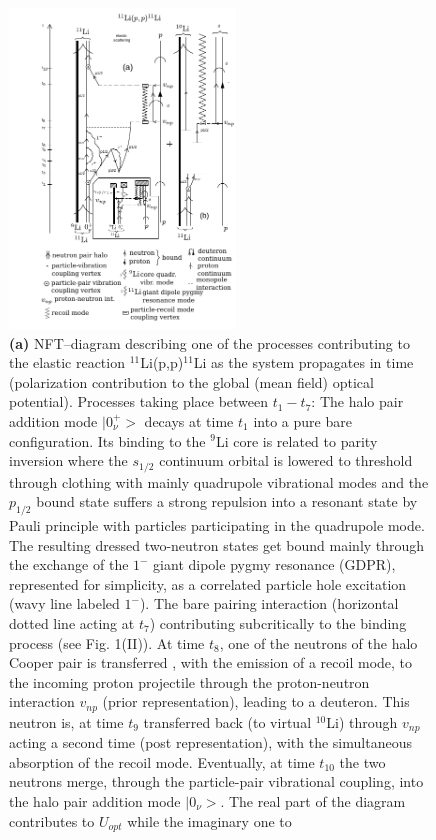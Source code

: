     \begin{figure}
    \centerline{\includegraphics*[width=6cm,angle=0]{C8/figsC8/Nobel40Years-1_new}}
    	\caption{{\bf (a)}  NFT--diagram describing  one of the processes contributing to the elastic reaction $^{11}$Li(p,p)$^{11}$Li as the system propagates in time
    	    	(polarization contribution to the global  (mean field) optical potential).  Processes taking place  between $t_1-t_7$: The halo pair addition mode $|0^+_{\nu}>$ decays at time $t_1$ into a pure bare configuration. Its binding to the $^9$Li core  is related to parity inversion where the $s_{1/2}$ continuum orbital is  lowered to threshold  through clothing  with mainly quadrupole  vibrational modes and the $p_{1/2}$ bound state suffers a strong repulsion into a resonant  state by Pauli principle with particles participating  in the quadrupole mode. The resulting dressed two-neutron states get bound mainly through the exchange  of the $1^-$ giant dipole pygmy resonance (GDPR), represented for simplicity, as a correlated particle hole excitation (wavy line labeled $1^-$). The bare pairing interaction  (horizontal dotted
    	    	line acting at $t_7$) contributing subcritically to the binding process (see Fig. 1(II)).
    	    	At time $t_8$, one of the neutrons of the halo Cooper  pair is transferred , with the emission of a recoil mode, to the incoming  proton  projectile through  the proton-neutron interaction $v_{np}$ (prior representation),  leading to a deuteron. This 
    	    	 neutron is, at time $t_9$ transferred  back (to virtual $^{10}$Li) through  $v_{np}$ acting a second time  (post representation), with the simultaneous  absorption of the recoil mode. Eventually, at  time $t_{10}$ the two neutrons merge, through  the particle-pair vibrational coupling, into  the halo pair addition mode $|0_{\nu}>$. The real part of  the diagram contributes to $U_{opt}$ while the imaginary one to
}
\end{figure}
